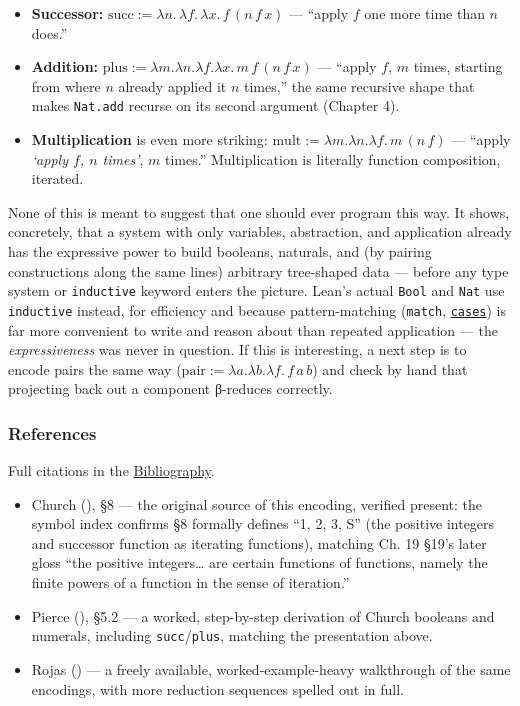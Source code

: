 \begin{itemize}
\tightlist
\item
  \textbf{Successor:} \(\mathrm{succ} := \lambda n.\, \lambda f.\, \lambda x.\,
  f\,(n\, f\, x)\) --- ``apply \(f\) one more time than \(n\) does.''
\item
  \textbf{Addition:} \(\mathrm{plus} := \lambda m.\lambda n.\lambda f.\lambda x.\,
  m\, f\,(n\, f\, x)\) --- ``apply \(f\), \(m\) times, starting from where \(n\) already applied it \(n\) times,'' the same recursive shape that makes \texttt{Nat.add} recurse on its second argument (Chapter 4).
\item
  \textbf{Multiplication} is even more striking: \(\mathrm{mult} := \lambda m.
  \lambda n.\lambda f.\, m\,(n\, f)\) --- ``apply \emph{`apply \(f\), \(n\) times'}, \(m\) times.'' Multiplication is literally function composition, iterated.
\end{itemize}

None of this is meant to suggest that one should ever program this way. It shows, concretely, that a system with only variables, abstraction, and application already has the expressive power to build booleans, naturals, and (by pairing constructions along the same lines) arbitrary tree-shaped data --- before any type system or \texttt{inductive} keyword enters the picture. Lean's actual \texttt{Bool} and \texttt{Nat} use \texttt{inductive} instead, for efficiency and because pattern-matching (\texttt{match}, \href{https://lean-lang.org/doc/reference/latest/Tactic-Proofs/Tactic-Reference/}{\texttt{cases}}) is far more convenient to write and reason about than repeated application --- the \emph{expressiveness} was never in question. If this is interesting, a next step is to encode pairs the same way (\(\mathrm{pair} := \lambda a.\lambda b.\lambda f.\,
f\, a\, b\)) and check by hand that projecting back out a component β-reduces correctly.

\subsubsection{References}\label{sec:13-next-steps:03-next-projects:8}

Full citations in the \hyperref[sec:root:bibliography:1]{Bibliography}.

\begin{itemize}
\tightlist
\item
  Church (\cite{Church1941}), §8 --- the original source of this encoding, verified present: the symbol index confirms §8 formally defines ``1, 2, 3, S'' (the positive integers and successor function as iterating functions), matching Ch. 19 §19's later gloss ``the positive integers\ldots{} are certain functions of functions, namely the finite powers of a function in the sense of iteration.''
\item
  Pierce (\cite{Pierce2002}), §5.2 --- a worked, step-by-step derivation of Church booleans and numerals, including \texttt{succ}/\texttt{plus}, matching the presentation above.
\item
  Rojas (\cite{Rojas2015}) --- a freely available, worked-example-heavy walkthrough of the same encodings, with more reduction sequences spelled out in full.
\end{itemize}
